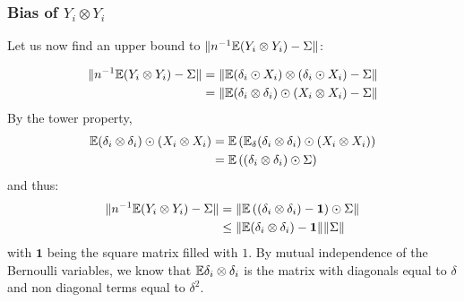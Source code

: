 \documentclass{article}
\numberwithin{equation}{section}
\begin{document}
\subsubsection{Bias of $Y_i\otimes Y_i$}

Let us now find an upper bound to $\lVert n^{-1}\mathbb{E}(Y_i\otimes Y_i) - \Sigma \rVert$:

\begin{equation*}
    \begin{split}
        \lVert n^{-1}\mathbb{E}(Y_i\otimes Y_i) - \Sigma \rVert &= \lVert \mathbb{E} (\delta_i \odot X_i) \otimes (\delta_i \odot X_i) - \Sigma \rVert\\
        &= \lVert \mathbb{E}(\delta_i\otimes \delta_i) \odot (X_i \otimes X_i) - \Sigma \rVert
    \end{split}
\end{equation*}
By the tower property,
\begin{equation*}
\begin{split}
    \mathbb{E} (\delta_i\otimes \delta_i) \odot (X_i \otimes X_i) &= \mathbb{E} \left( \mathbb{E}_\delta (\delta_i\otimes \delta_i) \odot (X_i \otimes X_i) \right)\\
    &= \mathbb{E} \left( (\delta_i\otimes \delta_i) \odot \Sigma \right)
\end{split}
\end{equation*}
and thus:
\begin{equation*}
    \begin{split}
        \lVert n^{-1}\mathbb{E}(Y_i\otimes Y_i) - \Sigma \rVert
        &= \lVert \mathbb{E}\left((\delta_i\otimes \delta_i) - \bm{1} \right)\odot\Sigma \rVert\\
        &\leq \lVert \mathbb{E} (\delta_i\otimes \delta_i) - \bm{1} \rVert\lVert \Sigma \rVert
    \end{split}
\end{equation*}
with $\bm{1}$ being the square matrix filled with $1$. By mutual independence of the Bernoulli variables, we know that $\mathbb{E} \delta_i \otimes \delta_i$ is the matrix with diagonals equal to $\delta$ and non diagonal terms equal to $\delta^2$.



\end{document}
